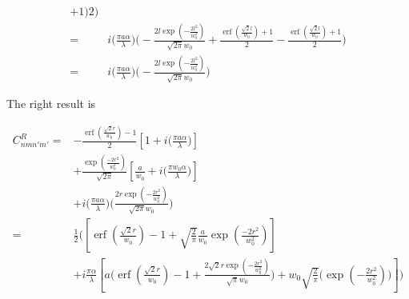 \documentclass[aps,twoside,secnumarabic,balancelastpage,amsmath,amssymb,nofootinbib,hyperref=pdftex]{revtex4}
\begin{document}
\begin{align*}
{							+
							1
							)
							}
							{
							2 
							}
                \Bigg)
           \\=&
            			i  
				\big( \frac{\pi a \alpha}{ \lambda} \big)
                \Bigg(
                        	-\frac
                        	{2 l \exp({-\frac{2l^2}{w_0^2}})}
                        	{ \sqrt{2 \pi} w_0}
                        	+
                        	\frac{
                        	\operatorname{erf}
                        		\left(
                        		\frac{\sqrt{2}l}{w_0}
                        		\right)
                        	+
                        	1
                        	}
                        	{2}
                        	-
                    	\frac{
							\operatorname{erf}(\frac{\sqrt{2} l}{w_0})
							+
							1
							}
							{
							2  
							}
                \Bigg)
                                           \\=&
            			i  
				\big( \frac{\pi a \alpha}{ \lambda} \big)
                \Bigg(
                        	-\frac
                        	{2 l \exp({-\frac{2l^2}{w_0^2}})}
                        	{ \sqrt{2 \pi} w_0}
                \Bigg)                                        
\end{align*}

The right result is

\begin{align*}
C_{nmn'm'}^{R} =  &
                  -{ \frac{             
             \operatorname{erf}(\frac{\sqrt{2} r}{w_0})
             -1
         	}{2} }
        \left[
				1+
				i \big( \frac{ \pi a \alpha}{ \lambda} \big)
			\right] 
	\\& +
\frac{\exp( \frac{-2r^2}{w_0^2})}{\sqrt{2 \pi}} 
        	\left[
                \frac{a}{w_{0}}		
                +
                i  \big( \frac{\pi w_{0} \alpha}{\lambda} \big)
			\right]
	\\& +
            			i  
				\big( \frac{\pi a \alpha}{ \lambda} \big)
                \Bigg(
                        	\frac
                        	{2 r \exp({-\frac{2r^2}{w_0^2}})}
                        	{ \sqrt{2 \pi} w_0} 
                 \Bigg) 
  \\=&
\frac{1}{2}	(	
		\left[            
             \operatorname{erf}(\frac{\sqrt{2} r}{w_0})
             -
             1
         +
         \sqrt{ \frac{2}{\pi} }
         \frac{a}{w_{0}}
         \exp( \frac{-2r^2}{w_0^2})                
		\right]
	\\& +
	i \frac{\pi \alpha}{\lambda}
	\left[
	  a 
		\Bigg(\operatorname{erf}(\frac{\sqrt{2} r}{w_0})
             -
             1
             +
                        	\frac
                        	{2 \sqrt{2} r \exp({-\frac{2r^2}{w_0^2}})}
                        	{ \sqrt{\pi} w_0} 
             \Bigg)        
        +  
        w_{0}\sqrt{\frac{2}{\pi}}
        \Bigg(        	                        	
                        \exp({-\frac{2r^2}{w_0^2}}) 
        \Bigg)  
	\right] )
\end{align*}
\end{document}
